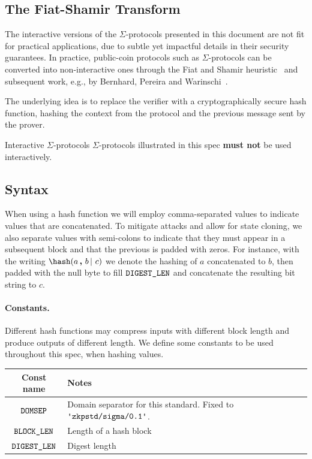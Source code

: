 \documentclass[11pt]{article}
\begin{document}
\subsection{The Fiat-Shamir Transform}\label{sec:fs}

The interactive versions of the $\Sigma$-protocols presented in this document are not fit for practical applications, due to subtle yet impactful details in their security guarantees.
In practice, public-coin protocols such as $\Sigma$-protocols can be converted into non-interactive ones through the
Fiat and Shamir heuristic~\cite{C:FiaSha86} and subsequent work, e.g., by Bernhard, Pereira and Warinschi~\cite{AC:BerPerWar12}.

The underlying idea is to replace the verifier with a cryptographically secure hash function, hashing the context from the protocol and the previous message sent by the prover.

\begin{warning}{Interactive $\Sigma$-protocols}{} $\Sigma$-protocols illustrated in this spec \textbf{must not} be used interactively.
\end{warning}

\subsection{Syntax}

When using a hash function we will employ comma-separated values to indicate values that are concatenated.
To mitigate attacks and allow for state cloning, we also separate values with semi-colons
to indicate that they must appear in a subsequent block and that the previous is padded with zeros. For instance, with the writing $\hash(a \concat b \concatblock c)$ we denote the hashing of $a$ concatenated to $b$, then padded with the null byte to fill $\texttt{DIGEST\_LEN}$ and concatenate the resulting bit string to $c$.

\paragraph{Constants.} Different hash functions may compress inputs with different block length and produce outputs of different length. We define some constants to be used throughout this spec, when hashing values.

\begin{center}
\begin{tabular}{cl}
  Const name & Notes \\
  \hline
  $\texttt{DOMSEP}$ & Domain separator for this standard. Fixed to $\domsepctx$.   \\
  $\texttt{BLOCK\_LEN}$ & Length of a hash block \\
  $\texttt{DIGEST\_LEN}$ & Digest length
\end{tabular}
\end{center}
\end{document}
